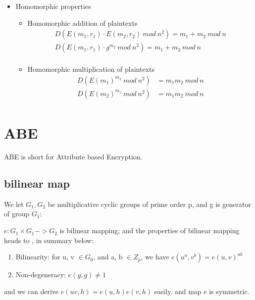 \documentclass[a4paper,11pt]{article}
\begin{document}
\begin{itemize}
\item {Homomorphic properties}

\begin{itemize}
\item {Homomorphic addition of plaintexts}
\begin{equation}
\begin{split}
D(E(m_1, r_1) \cdot E(m_2, r_2)\ mod\ n^2) = m_1 + m_2\ mod\ n \\
D(E(m_1, r_1) \cdot g^{m_2}\ mod\ n^2) = m_1 + m_2\ mod\ n \\
\end{split}
\end{equation}
\item {Homomorphic multiplication of plaintexts}
\begin{equation}
\begin{split}
D(E(m_1)^{m_2}\ mod\ n^2) &= m_1 m_2\ mod\ n \\
D(E(m_2)^{m_1}\ mod\ n^2) &= m_1 m_2\ mod\ n \\
\end{split}
\end{equation}
\end{itemize}

\end{itemize}

\section{ABE}
ABE is short for  Attribute based Encryption.

\subsection{bilinear map} 
We  let $G_1, G_2$ be multiplicative cyclic groups of prime order p,  and g is generator of group $G_1$:

$e: G_1 \times G_1 -> G_2$ is bilinear mapping;  and the properties of bilinear mapping heads to  \cite{s1}, in summary below:

\begin{enumerate}
\item Bilinearity: for u, v $ \in G_0$, and a, b $\in Z_p$, we have $e(u^a, v^b) = e(u, v)^{ab}$
\item Non-degeneracy:  $e(g, g) \neq 1$
\end{enumerate}
and we can derive $ e(u  v, h) = e(u, h)  e(v, h)$ easily. and map e is symmetric.
\end{document}
